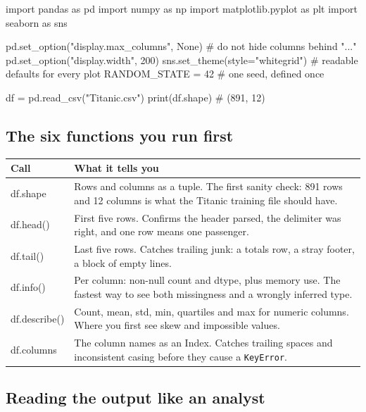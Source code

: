\documentclass[11pt,a4paper]{article}
\begin{document}

\begin{py}
import pandas as pd
import numpy as np
import matplotlib.pyplot as plt
import seaborn as sns

pd.set_option("display.max_columns", None)   # do not hide columns behind "..."
pd.set_option("display.width", 200)
sns.set_theme(style="whitegrid")             # readable defaults for every plot
RANDOM_STATE = 42                            # one seed, defined once

df = pd.read_csv("Titanic.csv")
print(df.shape)                              # (891, 12)
\end{py}

\subsection{The six functions you run first}

\begin{tabularx}{\textwidth}{@{}>{\ttfamily}l X@{}}
\toprule
\rowcolor{tablehead} \textrm{\bfseries Call} & \textbf{What it tells you} \\
\midrule
df.shape & Rows and columns as a tuple. The first sanity check: 891 rows and 12 columns is what the Titanic training file should have. \\
df.head() & First five rows. Confirms the header parsed, the delimiter was right, and one row means one passenger. \\
df.tail() & Last five rows. Catches trailing junk: a totals row, a stray footer, a block of empty lines. \\
df.info() & Per column: non-null count and dtype, plus memory use. The fastest way to see both missingness and a wrongly inferred type. \\
df.describe() & Count, mean, std, min, quartiles and max for numeric columns. Where you first see skew and impossible values. \\
df.columns & The column names as an Index. Catches trailing spaces and inconsistent casing before they cause a \lstinline|KeyError|. \\
\bottomrule
\end{tabularx}

\subsection{Reading the output like an analyst}
\end{document}
